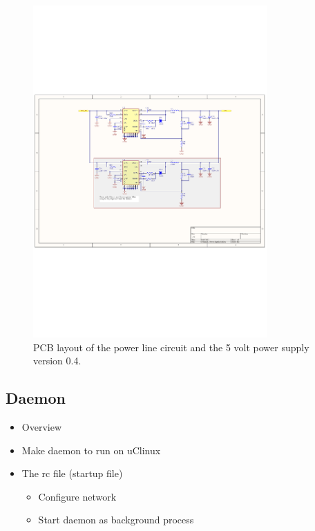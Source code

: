 \begin{figure}[H]
	\begin{centering}
		 \includegraphics[width=0.8\textwidth,page=3,angle=0]{images/SIG60_v0_4}
		\caption{PCB layout of the power line circuit and the 5 volt power supply version 0.4.}
	\end{centering}
\end{figure}


\subsection{Daemon}
\begin{itemize}
	\item Overview
	\item Make daemon to run on uClinux
	\item The rc file (startup file)
	\begin{itemize}
		\item Configure network
		\item Start daemon as background process
	\end{itemize}
\end{itemize}


